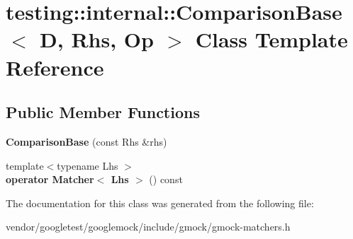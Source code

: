 \hypertarget{classtesting_1_1internal_1_1ComparisonBase}{}\section{testing\+:\+:internal\+:\+:Comparison\+Base$<$ D, Rhs, Op $>$ Class Template Reference}
\label{classtesting_1_1internal_1_1ComparisonBase}
\subsection*{Public Member Functions}
\begin{DoxyCompactItemize}
\item 
{\bfseries Comparison\+Base} (const Rhs \&rhs)\hypertarget{classtesting_1_1internal_1_1ComparisonBase_a365f20e35a604195c869ec0c0bc4c3a3}{}\label{classtesting_1_1internal_1_1ComparisonBase_a365f20e35a604195c869ec0c0bc4c3a3}

\item 
{\footnotesize template$<$typename Lhs $>$ }\\{\bfseries operator Matcher$<$ Lhs $>$} () const \hypertarget{classtesting_1_1internal_1_1ComparisonBase_a7d329851ff6ecffebe8c1e332504bad3}{}\label{classtesting_1_1internal_1_1ComparisonBase_a7d329851ff6ecffebe8c1e332504bad3}

\end{DoxyCompactItemize}


The documentation for this class was generated from the following file\+:\begin{DoxyCompactItemize}
\item 
vendor/googletest/googlemock/include/gmock/gmock-\/matchers.\+h\end{DoxyCompactItemize}
